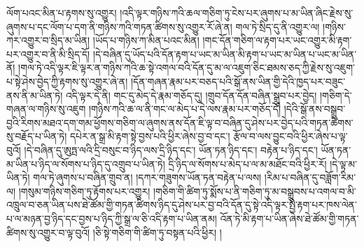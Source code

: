 ལོག་པའང་མིན་པ་རྟགས་སུ་འགྱུར། །འདི་ལྟར་གཉིས་ཀའི་ཆལ་གཅིག་ཏུ་ངེས་པར་ཞུགས་པ་མ་ཡིན་ཞིང་རྗེས་སུ་ཞུགས་པ་དང་ལོག་པ་དག་ནི་གཉིས་ཀའི་གཏན་ཚིགས་སུ་འགྱུར་རོ་ཞེ་ན། གལ་ཏེ་སྲིད་དུ་ནི་འགྱུར་ལ། །གཉིས་ཀར་འགྱུར་བ་སྲིད་མ་ཡིན། །ཡོད་པ་གཉིས་ཀ་མིན་པའང་མིན། །གང་དོན་གཅིག་ལ་རྟག་པར་ཡང་འགྱུར་མི་རྟག་པར་འགྱུར་བ་ནི་མི་སྲིད་དོ། །དེ་བཞིན་དུ་ཡོད་པའི་དོན་རྟག་པ་ཡང་མ་ཡིན་མི་རྟག་པ་ཡང་མ་ཡིན་པ་ཡང་མ་ཡིན་ནོ། །གལ་ཏེ་འདི་ལྟར་ཇི་ལྟར་ན་གཉིས་ཀའི་ཆ་སྟེ་འགལ་བའི་དོན་དུ་མ་ལ་འཇུག་ཅིང་ཐམས་ཅད་ཀྱི་རྗེས་སུ་འཇུག་པ་སྟེ་ཤེས་བྱེད་ཀྱི་རྟགས་སུ་འགྱུར་ཞེ་ན། །དོན་གཞན་རྣམ་པར་བཅད་པའི་སྒོ་ནས་ཡིན་གྱི་དེའི་ཁྱད་པར་བཟུང་ནས་ནི་མ་ཡིན་ཏེ། འདི་ལྟར་དེ་ནི། གང་དུ་མེད་དེ་རྣམ་གཅོད་དུ། །གྲུབ་དོན་དོན་བཞིན་སྒྲུབ་པར་བྱེད། །གཅིག་དེ་གཞན་ལ་གཉིས་སུ་འཇུག །གཉིས་ཀའི་ཆ་ལ་ནི་གང་ལ་མེད་པ་དེ་ལས་རྣམ་པར་གཅོད་དོ། །དེའི་སྒོ་ནས་བསྒྲུབ་བྱའི་རིགས་མཐའ་དག་གམ་ཕྱོགས་གཅིག་ལ་ཞུགས་ནས་དོན་ཇི་ལྟ་བ་བཞིན་དུ་ཤེས་པར་བྱེད་པའི་གཏན་ཚིགས་སུ་བརྗོད་པ་ཡིན་ཏེ། དཔེར་ན་སྒྲ་མི་རྟག་སྟེ་བྱས་པའི་ཕྱིར་ཞེས་བྱ་བ་དང་། རྩོལ་བ་ལས་བྱུང་བའི་ཕྱིར་ཞེས་པ་ལྟ་བུའོ། །དེ་བཞིན་དུ་ཨུཏྤ་ལའི་དྲི་བསུང་བ་ཉིད་ལས་དྲི་ཉིད་དང་། ཡོན་ཏན་ཉིད་དང་། བརྟེན་པ་ཉིད་དང་། ཡོན་ཏན་མ་ཡིན་པ་ཉིད་ལ་སོགས་པ་ཉིད་དུ་འགྲུབ་པ་ཡིན་ཏེ། དྲི་ཉིད་ལ་སོགས་པ་མེད་པ་ལ་མ་མཐོང་བའི་ཕྱིར་རོ། །དེ་ལྟ་མ་ཡིན་ཏེ། གལ་ཏེ་ཞུགས་པ་བཞིན་གྲུབ་ན། །དཀར་གཟུགས་ཡོན་ཏན་བརྟེན་པ་ལས། །རིམ་པ་བཞིན་དུ་བཟློག་རིམ་ལ། །གསུམ་གཉིས་གཅིག་ཏུ་རྟོགས་པར་འགྱུར། །གཅིག་གི་ཚིག་ཏུ་སྨོས་པ་ནི་གཅིག་ཏུ་མ་བསྒྲུབས་པ་འགལ་བ་མི་འཁྲུལ་བ་ཅན་ཡིན་པས་ཐེ་ཚོམ་གྱི་གཏན་ཚིགས་ཉིད་དུ་ཤེས་པར་བྱ་བའི་དོན་དུ་སྟེ་འདི་ལྟར་སྤྱི་རྟག་པར་ཁས་ལེན་པ་ལ་མཉན་བྱ་ཉིད་དང་བྱས་པ་ཉིད་ཀྱི་སྒྲ་ལ་ཅི་འདི་རྟག་པ་ཡིན་ནམ། འོན་ཏེ་མི་རྟག་པ་ཡིན་ཞེས་ཐེ་ཚོམ་གྱི་གཏན་ཚིགས་སུ་འགྱུར་བ་ལྟ་བུའོ། །ཅི་སྟེ་གཅིག་གི་ཚིག་ཏུ་བསྟན་པའི་ཕྱིར། །
